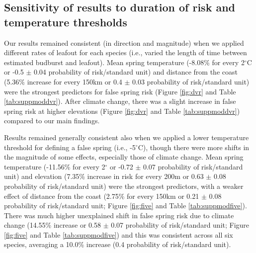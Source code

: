 \documentclass{article}\usepackage[]{graphicx}\usepackage[]{color}
\begin{document}

\subsection*{Sensitivity of results to duration of risk and temperature thresholds}
Our results remained consistent (in direction and magnitude) when we applied different rates of leafout for each species (i.e., varied the length of time between estimated budburst and leafout). Mean spring temperature (-8.08\% for every 2$^\circ$C or -0.5 $\pm$ 0.04 probability of risk/standard unit) and distance from the coast (5.36\% increase for every 150km or 0.4 $\pm$ 0.03 probability of risk/standard unit) were the strongest predictors for false spring risk (Figure \ref{fig:dvr} and Table \ref{tab:suppmoddvr}). After climate change, there was a slight increase in false spring risk at higher elevations (Figure \ref{fig:dvr} and Table \ref{tab:suppmoddvr}) compared to our main findings. 

Results remained generally consistent also when we applied a lower temperature threshold for defining a false spring (i.e., -5$^{\circ}$C), though there were more shifts in the magnitude of some effects, especially those of climate change. Mean spring temperature (-11.56\% for every 2$^\circ$ or -0.72 $\pm$ 0.07 probability of risk/standard unit) and elevation (7.35\% increase in risk for every 200m or 0.63 $\pm$ 0.08 probability of risk/standard unit) were the strongest predictors, with a weaker effect of distance from the coast (2.75\% for every 150km or 0.21 $\pm$ 0.08 probability of risk/standard unit; Figure \ref{fig:five} and Table \ref{tab:suppmodfive}). There was much higher unexplained shift in false spring risk due to climate change (14.55\% increase or 0.58 $\pm$ 0.07 probability of risk/standard unit; Figure \ref{fig:five} and Table \ref{tab:suppmodfive}) and this was consistent across all six species, averaging a 10.0\% increase (0.4 probability of risk/standard unit). 
\end{document}
